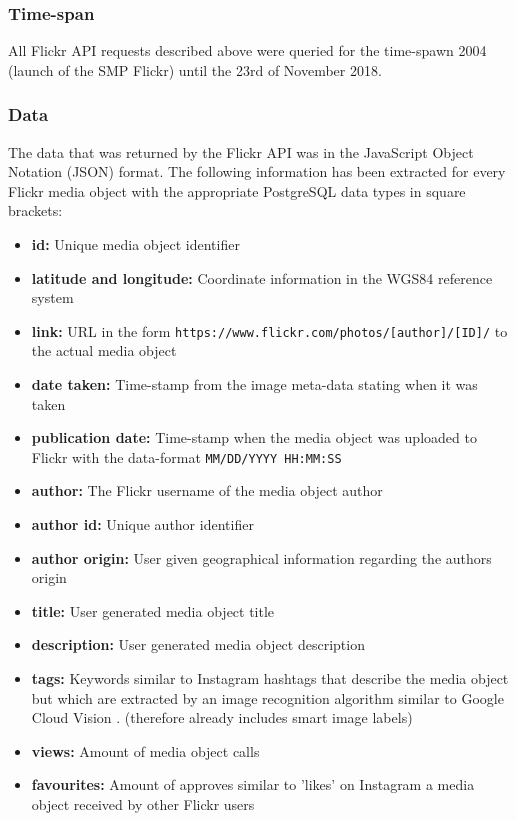\subsubsection*{Time-span} \label{flickr_timespan}
All Flickr API requests described above were queried for the time-spawn 2004 (launch of the SMP Flickr) until the 23rd of November 2018.

\subsubsection*{Data} \label{flickr_data}
The data that was returned by the Flickr API was in the JavaScript Object Notation (JSON) format. The following information has been extracted for every Flickr media object with the appropriate PostgreSQL data types in square brackets:\\

\begin{itemize}[label={}]
    \item \textbf{id:} Unique media object identifier 
    \item \textbf{latitude and longitude:} Coordinate information in the WGS84 reference system 
    \item \textbf{link:} URL in the form \texttt{https://www.flickr.com/photos/[author]/[ID]/} to the actual media object 
    \item \textbf{date taken:} Time-stamp from the image meta-data stating when it was taken 
    \item \textbf{publication date:} Time-stamp when the media object was uploaded to Flickr with the data-format \texttt{MM/DD/YYYY HH:MM:SS} 
    \item \textbf{author:} The Flickr username of the media object author 
    \item \textbf{author id:} Unique author identifier  
    \item \textbf{author origin:} User given geographical information regarding the authors origin 
    \item \textbf{title:} User generated media object title 
    \item \textbf{description:} User generated media object description 
    \item \textbf{tags:} Keywords similar to Instagram hashtags that describe the media object but which are extracted by an image recognition algorithm similar to Google Cloud Vision \parencite{Flickr2019}. (therefore already includes smart image labels) 
    \item \textbf{views:} Amount of media object calls 
    \item \textbf{favourites:} Amount of approves similar to 'likes' on Instagram a media object received by other Flickr users 
\end{itemize}

